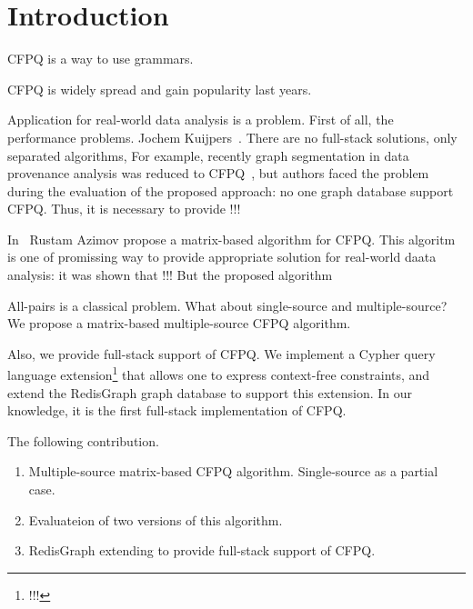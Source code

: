 \section{Introduction}

CFPQ is a way to use grammars.

CFPQ is widely spread and gain popularity last years.

Application for real-world data analysis is a problem.
First of all, the performance problems. Jochem Kuijpers~\cite{Kuijpers:2019:ESC:3335783.3335791}.
There are no full-stack solutions, only separated algorithms, 
For example, recently graph segmentation in data provenance analysis was reduced to CFPQ~\cite{!!!}, but authors faced the problem during the evaluation of the proposed approach: no one graph database support CFPQ.
Thus, it is necessary to provide !!!

In~\cite{Azimov:2018:CPQ:3210259.3210264} Rustam Azimov propose a matrix-based algorithm for CFPQ.
This algoritm is one of promissing way to provide appropriate solution for real-world daata analysis: it was shown that !!!
But the proposed algorithm

All-pairs is a classical problem.
What about single-source and multiple-source?
We propose a matrix-based multiple-source CFPQ algorithm.

Also, we provide full-stack support of CFPQ.
We implement a Cypher query language extension\footnote{!!!} that allows one to express context-free constraints, and extend the RedisGraph graph database to support this extension.
In our knowledge, it is the first full-stack implementation of CFPQ.

The following contribution.
\begin{enumerate}
	\item Multiple-source matrix-based CFPQ algorithm. 
	Single-source as a partial case.
	\item Evaluateion of two versions of this algorithm.
	\item RedisGraph extending to provide full-stack support of CFPQ.
\end{enumerate}